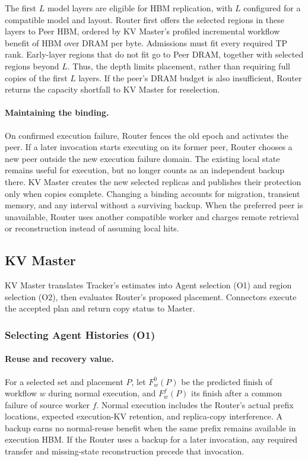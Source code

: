 The first $L$ model layers are eligible for HBM replication, with $L$
configured for a compatible model and layout. Router first offers the
selected regions in these layers to Peer HBM, ordered by KV Master's
profiled incremental workflow benefit of HBM over DRAM per byte.
Admissions must fit every required TP rank. Early-layer regions that
do not fit go to Peer DRAM, together with selected regions beyond $L$.
Thus, the depth limits placement, rather than requiring full copies
of the first $L$ layers. If the peer's DRAM budget is also insufficient,
Router returns the capacity shortfall to KV Master for reselection.

\paragraph{Maintaining the binding.}
On confirmed execution failure, Router fences the old epoch and
activates the peer. If a later invocation starts executing on its former
peer, Router chooses a new peer outside the new execution failure
domain. The existing local state remains useful for execution, but no
longer counts as an independent backup there. KV Master creates the
new selected replicas and publishes their protection only when copies
complete. Changing a binding accounts for migration, transient memory,
and any interval without a surviving backup. When the preferred peer
is unavailable, Router uses another compatible worker and charges
remote retrieval or reconstruction instead of assuming local hits.

\subsection{KV Master}
\label{sec:master}

KV Master translates Tracker's estimates into Agent selection (O1)
and region selection (O2), then evaluates Router's proposed placement.
Connectors execute the accepted plan and return copy status to Master.

\subsubsection{Selecting Agent Histories (O1)}
\label{sec:agent-protection}

\paragraph{Reuse and recovery value.}
For a selected set and placement $P$, let $F_w^0(P)$ be the predicted
finish of workflow $w$ during normal execution, and $F_w^f(P)$ its finish
after a common failure of source worker $f$. Normal execution includes
the Router's actual prefix locations, expected execution-KV retention,
and replica-copy interference. A backup earns no normal-reuse benefit
when the same prefix remains available in execution HBM. If the Router
uses a backup for a later invocation, any required transfer and
missing-state reconstruction precede that invocation.

